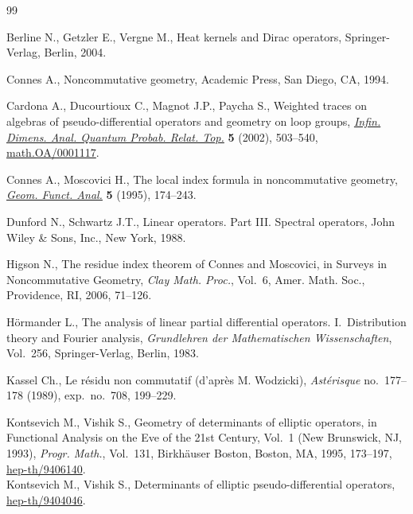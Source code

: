 \documentclass[pdftex]{sigma}
\numberwithin{equation}{section}
\begin{document}
\begin{thebibliography}{99}

\footnotesize\itemsep=0.5pt

Berline N., Getzler  E., Vergne M.,
Heat kernels and Dirac operators,
Springer-Verlag, Berlin, 2004.


Connes A.,
Noncommutative geometry,
Academic Press, San Diego, CA, 1994.


  Cardona  A.,  Ducourtioux C.,  Magnot J.P., Paycha  S.,
Weighted traces on algebras of pseudo-dif\/ferential operators and geometry on loop groups,
\href{http://dx.doi.org/10.1142/S021902570200095X}{{\it Infin. Dimens. Anal. Quantum Probab. Relat. Top.}} {\bf 5} (2002), 503--540,
\href{http://arxiv.org/abs/math.OA/0001117}{math.OA/0001117}.

 Connes A., Moscovici H.,
 The local index formula in noncommutative geometry,
 \href{http://dx.doi.org/10.1007/BF01895667}{{\it Geom. Funct. Anal.}} {\bf 5} (1995), 174--243.

Dunford N.,  Schwartz J.T.,
Linear operators. Part III. Spectral operators,
John Wiley \& Sons, Inc., New York, 1988.


Higson N.,
The residue index theorem of Connes and Moscovici,
in Surveys in Noncommutative Geometry, {\it Clay Math. Proc.}, Vol.~6, Amer. Math. Soc., Providence, RI, 2006, 71--126.


 H\"ormander L.,
 The analysis of linear partial dif\/ferential operators. I.~Distribution theory and Fourier ana\-ly\-sis,
 {\it Grundlehren der Mathematischen Wissenschaften}, Vol.~256, Springer-Verlag, Berlin, 1983.

   Kassel Ch.,
   Le r\'esidu non commutatif (d'apr\`es M. Wodzicki),
{\it Ast\'erisque} no.~177--178 (1989), exp.~no.~708, 199--229.

Kontsevich M., Vishik  S.,
Geometry of determinants of elliptic operators,
in Functional Analysis on the Eve of the 21st Century, Vol.~1 (New Brunswick, NJ, 1993), {\it Progr. Math.}, Vol.~131, Birkh\"auser Boston, Boston, MA, 1995, 173--197,
\href{http://arxiv.org/abs/hep-th/9406140}{hep-th/9406140}.
\\
Kontsevich M., Vishik  S.,
Determinants of elliptic pseudo-dif\/ferential operators, %
\href{http://arxiv.org/abs/hep-th/9404046}{hep-th/9404046}.


\end{thebibliography}
\end{document}
